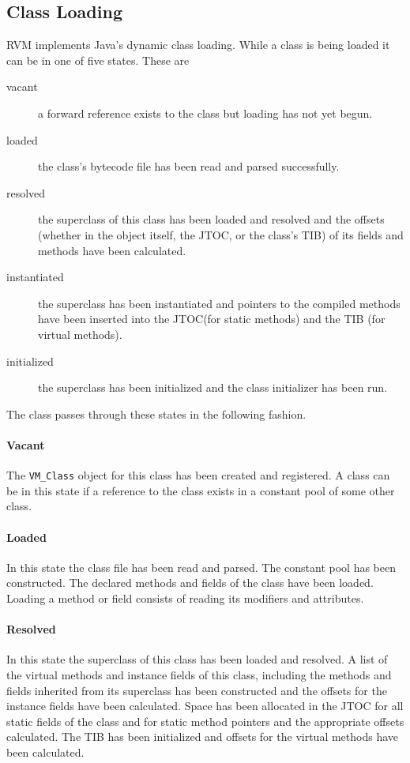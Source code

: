 \subsection{Class Loading} \label{sssec:classLoading}

RVM implements Java's dynamic class loading. While a class is being loaded it
can be in one of five states. These are
\begin{description}
\item[vacant] a forward reference exists to the class but loading has not yet 
begun.
\item[loaded] the class's bytecode file has been read and parsed successfully.
\item[resolved] the superclass of this class has been loaded and resolved and
the offsets (whether in the object itself, the JTOC, or the class's TIB) of its 
fields and methods have been calculated.
\item[instantiated] the superclass has been instantiated and pointers to the
compiled methods have been inserted into the JTOC(for static methods) and the
TIB (for virtual methods).
\item[initialized] the superclass has been initialized and the class
initializer has been run.
\end{description}

The class passes through these states in the following fashion.

\paragraph{Vacant}
The {\tt VM\_Class} object for this class has been created and registered. 
A class can be in this state if a reference to the class exists in a constant
pool of some other class.

\paragraph{Loaded} 
In this state the class file has been read and parsed.  The constant pool has 
been constructed. The declared methods and fields of the class have been loaded.
Loading a method or field consists of reading its modifiers and attributes.

\paragraph{Resolved}
In this state the superclass of this class has been loaded and resolved. 
A list of the virtual methods and instance fields of this class, including the 
methods and fields
inherited from its superclass has been constructed and the offsets for the 
instance fields have been calculated.  
Space has been allocated in the JTOC for all static fields of the class and for
static method pointers and the appropriate offsets calculated.
The TIB has been initialized and offsets for the virtual methods have been
calculated.

